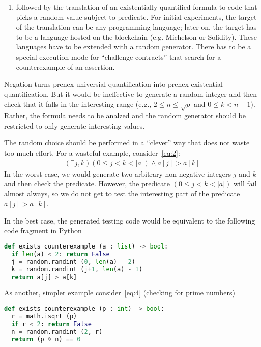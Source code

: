\documentclass{article}
\begin{document}
\begin{itemize}
\begin{enumerate}
  \item followed by the translation of an existentially quantified formula to code that picks a
    random value subject to predicate. For initial experiments, the target of the
    translation can be any programming 
    language; later on, the target has to be a language hosted on the blockchain
    (e.g. Michelson or Solidity). These languages have to be extended with a random
    generator. There has to be a special execution mode for ``challenge contracts''
    that search for a counterexample of an assertion.
  \end{enumerate}
  Negation turns prenex universial quantification into prenex existential quantification. But it
  would be ineffective to generate a random integer and then check that it falls in the
  interesting range (e.g., $2\le n \le \sqrt p$ and $0\le k< n-1$). Rather, the formula
  needs to be analzed and the random generator should be restricted to only generate
  interesting values. 

  The random choice should be performed in a ``clever'' way that does not waste too
  much effort. For a wasteful example, consider~\eqref{eq:2}:
  \begin{gather*}
    (\exists j, k ) (0\le j< k < |a|) \wedge a[j] > a[k]
  \end{gather*}
  In the worst case, we would generate two arbitrary non-negative integers $j$ and $k$
  and then check the predicate. However, the predicate $(0\le j< k < |a|)$ will fail
  almost always, so we do not get to test the interesting part of the predicate
  $a[j]>a[k]$.

  In the best case, the generated testing code would be equivalent to the following code fragment
  in Python
\begin{lstlisting}[language=Python]
def exists_counterexample (a : list) -> bool:
  if len(a) < 2: return False
  j = random.randint (0, len(a) - 2)
  k = random.randint (j+1, len(a) - 1)
  return a[j] > a[k]
\end{lstlisting}

  As another, simpler example consider~\eqref{eq:4} (checking for prime numbers)
\begin{lstlisting}[language=Python]
def exists_counterexample (p : int) -> bool:
  r = math.isqrt (p)
  if r < 2: return False
  n = random.randint (2, r)
  return (p % n) == 0
\end{lstlisting}


\end{itemize}
\end{document}
